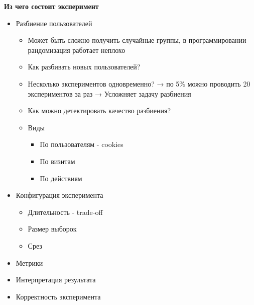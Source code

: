 \documentclass[a4paper, 12pt]{article}
\begin{document}
\textbf{Из чего состоит эксперимент}

\begin{itemize}
\item
  
  Разбиение пользователей
  

  \begin{itemize}
  \item
    
    Может быть сложно получить случайные группы, в программировании
    рандомизация работает неплохо
    
  \item
    
    Как разбивать новых пользователей?
    
  \item
    
    Несколько экспериментов одновременно? → по 5\% можно проводить 20
    экспериментов за раз → Усложняет задачу разбиения
    
  \item
    
    Как можно детектировать качество разбиения?
    
  \item
    
    {Виды}
    

    \begin{itemize}
    \item
      
      По пользователям - cookies
      
    \item
      
      По визитам
      
    \item
      
      По действиям
      
    \end{itemize}
  \end{itemize}
\item
  
  Конфигурация эксперимента
  

  \begin{itemize}
  \item
    
    Длительность - trade-off
    
  \item
    
    Размер выборок
    
  \item
    
    Срез
    
  \end{itemize}
\item
  
  Метрики
  
\item
  
  Интерпретация результата
  
\item
  
  Корректность эксперимента
  
\end{itemize}
\end{document}

